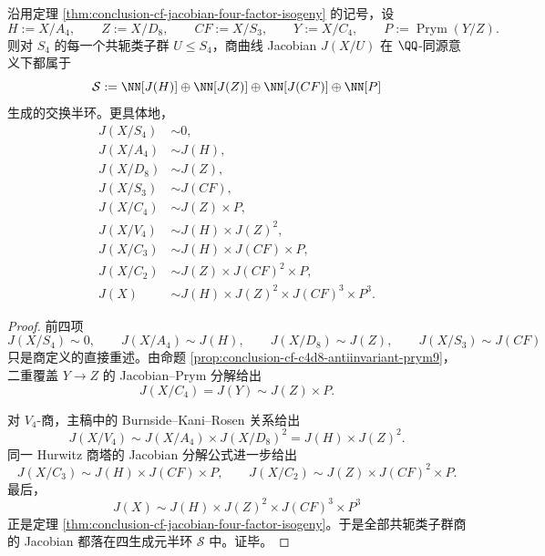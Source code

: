 \begin{theorem}\label{thm:conclusion-s4-hurwitz-jacobian-four-generator-semiring}
沿用定理 \ref{thm:conclusion-cf-jacobian-four-factor-isogeny} 的记号，设
\[
H:=X/A_4,\qquad
Z:=X/D_8,\qquad
CF:=X/S_3,\qquad
Y:=X/C_4,\qquad
P:=\operatorname{Prym}(Y/Z).
\]
则对 \(S_4\) 的每一个共轭类子群 \(U\le S_4\)，商曲线 Jacobian \(J(X/U)\) 在 \(\QQ\)-同源意义下都属于
\[
\mathcal S
:=
\NN[J(H)]\oplus \NN[J(Z)]\oplus \NN[J(CF)]\oplus \NN[P]
\]
生成的交换半环。更具体地，
\[
\begin{aligned}
J(X/S_4)&\sim 0,\\
J(X/A_4)&\sim J(H),\\
J(X/D_8)&\sim J(Z),\\
J(X/S_3)&\sim J(CF),\\
J(X/C_4)&\sim J(Z)\times P,\\
J(X/V_4)&\sim J(H)\times J(Z)^2,\\
J(X/C_3)&\sim J(H)\times J(CF)\times P,\\
J(X/C_2)&\sim J(Z)\times J(CF)^2\times P,\\
J(X)&\sim J(H)\times J(Z)^2\times J(CF)^3\times P^3.
\end{aligned}
\]
\end{theorem}
\begin{proof}
前四项
\[
J(X/S_4)\sim 0,\qquad
J(X/A_4)\sim J(H),\qquad
J(X/D_8)\sim J(Z),\qquad
J(X/S_3)\sim J(CF)
\]
只是商定义的直接重述。由命题 \ref{prop:conclusion-cf-c4d8-antiinvariant-prym9}，二重覆盖 \(Y\to Z\) 的 Jacobian--Prym 分解给出
\[
J(X/C_4)=J(Y)\sim J(Z)\times P.
\]

对 \(V_4\)-商，主稿中的 Burnside--Kani--Rosen 关系给出
\[
J(X/V_4)\sim J(X/A_4)\times J(X/D_8)^2
=
J(H)\times J(Z)^2.
\]
同一 Hurwitz 商塔的 Jacobian 分解公式进一步给出
\[
J(X/C_3)\sim J(H)\times J(CF)\times P,
\qquad
J(X/C_2)\sim J(Z)\times J(CF)^2\times P.
\]
最后，
\[
J(X)\sim J(H)\times J(Z)^2\times J(CF)^3\times P^3
\]
正是定理 \ref{thm:conclusion-cf-jacobian-four-factor-isogeny}。于是全部共轭类子群商的 Jacobian 都落在四生成元半环 \(\mathcal S\) 中。证毕。
\end{proof}

